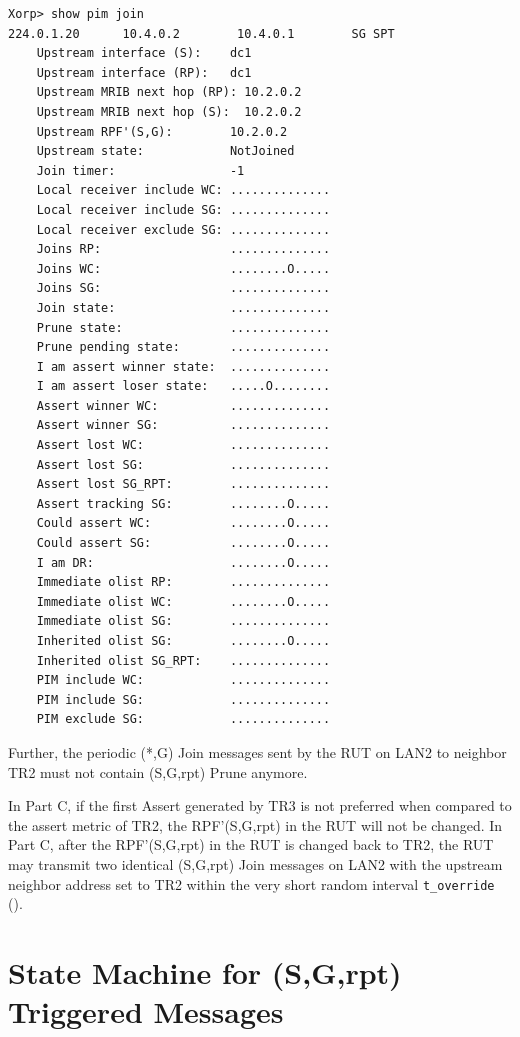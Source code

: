 \documentclass[11pt]{report}
\begin{document}
\begin{itemize}
\begin{verbatim}
Xorp> show pim join 
224.0.1.20      10.4.0.2        10.4.0.1        SG SPT 
    Upstream interface (S):    dc1
    Upstream interface (RP):   dc1
    Upstream MRIB next hop (RP): 10.2.0.2
    Upstream MRIB next hop (S):  10.2.0.2
    Upstream RPF'(S,G):        10.2.0.2
    Upstream state:            NotJoined 
    Join timer:                -1
    Local receiver include WC: ..............
    Local receiver include SG: ..............
    Local receiver exclude SG: ..............
    Joins RP:                  ..............
    Joins WC:                  ........O.....
    Joins SG:                  ..............
    Join state:                ..............
    Prune state:               ..............
    Prune pending state:       ..............
    I am assert winner state:  ..............
    I am assert loser state:   .....O........
    Assert winner WC:          ..............
    Assert winner SG:          ..............
    Assert lost WC:            ..............
    Assert lost SG:            ..............
    Assert lost SG_RPT:        ..............
    Assert tracking SG:        ........O.....
    Could assert WC:           ........O.....
    Could assert SG:           ........O.....
    I am DR:                   ........O.....
    Immediate olist RP:        ..............
    Immediate olist WC:        ........O.....
    Immediate olist SG:        ..............
    Inherited olist SG:        ........O.....
    Inherited olist SG_RPT:    ..............
    PIM include WC:            ..............
    PIM include SG:            ..............
    PIM exclude SG:            ..............
\end{verbatim}

  Further, the periodic (*,G) Join messages sent by the RUT on LAN2 to
  neighbor TR2 must not contain (S,G,rpt) Prune anymore.

\end{itemize}


In Part C, if the first Assert generated by TR3 is not preferred when compared
to the assert metric of TR2, the RPF'(S,G,rpt) in the RUT will not be changed.
In Part C, after the RPF'(S,G,rpt) in the RUT is changed back to TR2, the RUT
may transmit two identical (S,G,rpt) Join messages on LAN2 with the upstream
neighbor address set to TR2 within the very short random interval
\verb=t_override= ({\PimsmTOverride}).

\newpage
\section{State Machine for (S,G,rpt) Triggered Messages}
\end{document}
